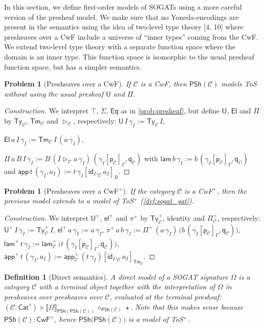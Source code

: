 \documentclass[10pt,a4paper]{amsart}
\newtheorem{definition}[theorem]{Definition}
\newtheorem{problem}[theorem]{Problem}
\newcommand{\Ty}{\mathsf{Ty}}
\newcommand{\Tm}{\mathsf{Tm}}
\newcommand{\U}{\mathsf{U}}
\newcommand{\El}{\mathsf{El}}
\newcommand{\lam}{\mathsf{lam}}
\newcommand{\app}{\mathsf{app}}
\newcommand{\el}{\mathsf{el}}
\newcommand{\ext}{\operatorname{\triangleright}}
\newcommand{\p}{\mathsf{p}}
\newcommand{\q}{\mathsf{q}}
\newcommand{\id}{\mathsf{id}}
\newcommand{\Eq}{\mathsf{Eq}}
\newcommand{\C}{\mathcal{C}}
\newcommand{\PSh}{\mathsf{PSh}}
\begin{document}
In this section, we define first-order models of SOGATs using a more
careful version of the presheaf model. We make sure that no
Yoneda-encodings are present in the semantics using the idea of
two-level type theory
[4, 10]
where presheaves over a CwF include a universe of ``inner types''
coming from the CwF. We extend two-level type theory with a separate function space
where the domain is an inner type. This function space is isomorphic
to the usual presheaf function space, but has a simpler semantics.
\begin{problem}[Presheaves over a CwF]\label{prob:psh_gat}
  If $\C$ is a CwF, then $\PSh(\C)$ models ToS without using the usual
  presheaf $\U$ and $\Pi$.
\end{problem}
\begin{proof}[Construction]
  We interpret $\top$, $\Sigma$, $\Eq$ as in \autoref{prob:presheaf},
  but define $\U$, $\El$ and $\Pi$ by $\Ty_\C$, $\Tm_\C$ and
  $\ext_\C$, respectively: $\U\,I\,\gamma_I := \Ty_\C\,I$,
  
  $\El\,a\,I\,\gamma_I := \Tm_\C\,I\,(a\,\gamma_I)$,
  
  $\Pi\,a\,B\,I\,\gamma_I := B\,(I\ext_\C a\,\gamma_I)\,(\gamma_I[\p_\C]_\Gamma,\q_\C)$ with
  $\lam\,b\,\gamma_I := b\,(\gamma_I[\p_\C]_\Gamma,\q_C)$ and
  $\app\,t\,(\gamma_I,a_I) := t\,\gamma_I[\id_I\mathbin{,_\C}a_I]_B$.
\end{proof}
\begin{problem}[Presheaves over a CwF$^+$]
  If the category $\C$ is a CwF$^+$, then the previous model extends
  to a model of ToS$^+$ (\autoref{def:sogat_gat}).
\end{problem}
\begin{proof}[Construction]
  We interpret $\U^+$, $\el^+$ and $\pi^+$ by $\Ty^+_\C$, identity and
  $\Pi^+_\C$, respectively: $\U^+\,I\,\gamma_I := \Ty^+_\C\,I$,
  $\el^+\,a\,\gamma_I := a\,\gamma_I$, $\pi^+\,a\,b\,\gamma_I :=
  \Pi^+\,(a\,\gamma_I)\,\big(b\,(\gamma_I[\p_\C]_\Gamma,\q_\C)\big)$,
  $\lam^+\,t\,\gamma_I :=
  \lam^+_\C\,\big(t\,(\gamma_I[\p_\C]_\Gamma,\q_\C)\big)$,
  $\app^+\,t\,(\gamma_I,a_I) :=
  \app^+_\C\,(t\,\gamma_I)[\id_I\mathbin{,_\C}a_I]_{\Tm_\C}$.
\end{proof}
\begin{definition}[Direct semantics]\label{def:direct}
  A direct model of a SOGAT signature $\Omega$ is a category $\C$ with a
  terminal object together with the interpretation of $\Omega$ in
  presheaves over presheaves over $\C$, evaluated at the terminal
  presheaf: $(\C:\mathsf{Cat}^\diamond) \times
  \llbracket\Omega\rrbracket_{\PSh(\PSh(\C))}\,\diamond_{\PSh(\C)}\,{\star}$. Note
  that this makes sense because
  $\PSh(\C):\mathsf{CwF}^+$, hence $\PSh\big(\PSh(\C)\big)$ is a model
  of ToS$^+$.
\end{definition}
\end{document}
